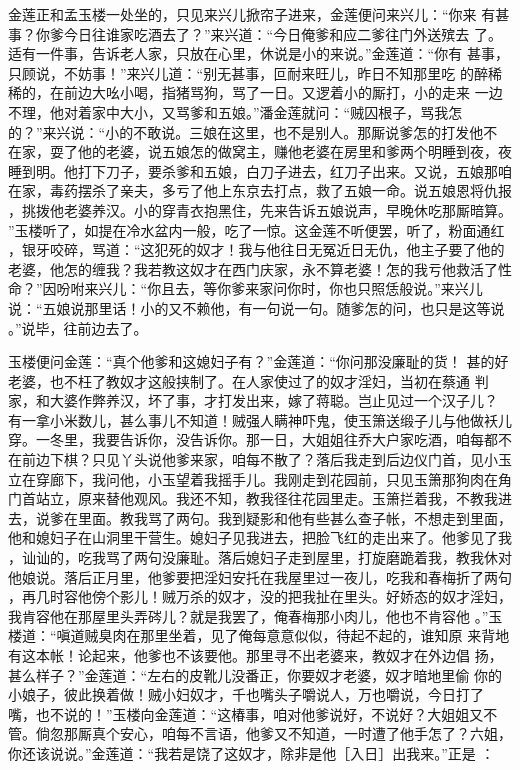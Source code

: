 金莲正和孟玉楼一处坐的，只见来兴儿掀帘子进来，金莲便问来兴儿：“你来
有甚事？你爹今日往谁家吃酒去了？”来兴道：“今日俺爹和应二爹往门外送殡去
了。适有一件事，告诉老人家，只放在心里，休说是小的来说。”金莲道：“你有
甚事，只顾说，不妨事！”来兴儿道：“别无甚事，叵耐来旺儿，昨日不知那里吃
的醉稀稀的，在前边大吆小喝，指猪骂狗，骂了一日。又逻着小的厮打，小的走来
一边不理，他对着家中大小，又骂爹和五娘。”潘金莲就问：“贼囚根子，骂我怎
的？”来兴说：“小的不敢说。三娘在这里，也不是别人。那厮说爹怎的打发他不
在家，耍了他的老婆，说五娘怎的做窝主，赚他老婆在房里和爹两个明睡到夜，夜
睡到明。他打下刀子，要杀爹和五娘，白刀子进去，红刀子出来。又说，五娘那咱
在家，毒药摆杀了亲夫，多亏了他上东京去打点，救了五娘一命。说五娘恩将仇报
，挑拨他老婆养汉。小的穿青衣抱黑住，先来告诉五娘说声，早晚休吃那厮暗算。
”玉楼听了，如提在冷水盆内一般，吃了一惊。这金莲不听便罢，听了，粉面通红
，银牙咬碎，骂道：“这犯死的奴才！我与他往日无冤近日无仇，他主子要了他的
老婆，他怎的缠我？我若教这奴才在西门庆家，永不算老婆！怎的我亏他救活了性
命？”因吩咐来兴儿：“你且去，等你爹来家问你时，你也只照恁般说。”来兴儿
说：“五娘说那里话！小的又不赖他，有一句说一句。随爹怎的问，也只是这等说
。”说毕，往前边去了。

玉楼便问金莲：“真个他爹和这媳妇子有？”金莲道：“你问那没廉耻的货！
甚的好老婆，也不枉了教奴才这般挟制了。在人家使过了的奴才淫妇，当初在蔡通
判家，和大婆作弊养汉，坏了事，才打发出来，嫁了蒋聪。岂止见过一个汉子儿？
有一拿小米数儿，甚么事儿不知道！贼强人瞒神吓鬼，使玉箫送缎子儿与他做袄儿
穿。一冬里，我要告诉你，没告诉你。那一日，大姐姐往乔大户家吃酒，咱每都不
在前边下棋？只见丫头说他爹来家，咱每不散了？落后我走到后边仪门首，见小玉
立在穿廊下，我问他，小玉望着我摇手儿。我刚走到花园前，只见玉箫那狗肉在角
门首站立，原来替他观风。我还不知，教我径往花园里走。玉箫拦着我，不教我进
去，说爹在里面。教我骂了两句。我到疑影和他有些甚么查子帐，不想走到里面，
他和媳妇子在山洞里干营生。媳妇子见我进去，把脸飞红的走出来了。他爹见了我
，讪讪的，吃我骂了两句没廉耻。落后媳妇子走到屋里，打旋磨跪着我，教我休对
他娘说。落后正月里，他爹要把淫妇安托在我屋里过一夜儿，吃我和春梅折了两句
，再几时容他傍个影儿！贼万杀的奴才，没的把我扯在里头。好娇态的奴才淫妇，
我肯容他在那屋里头弄硶儿？就是我罢了，俺春梅那小肉儿，他也不肯容他
。”玉楼道：“嗔道贼臭肉在那里坐着，见了俺每意意似似，待起不起的，谁知原
来背地有这本帐！论起来，他爹也不该要他。那里寻不出老婆来，教奴才在外边倡
扬，甚么样子？”金莲道：“左右的皮靴儿没番正，你要奴才老婆，奴才暗地里偷
你的小娘子，彼此换着做！贼小妇奴才，千也嘴头子嚼说人，万也嚼说，今日打了
嘴，也不说的！”玉楼向金莲道：“这椿事，咱对他爹说好，不说好？大姐姐又不
管。倘忽那厮真个安心，咱每不言语，他爹又不知道，一时遭了他手怎了？六姐，
你还该说说。”金莲道：“我若是饶了这奴才，除非是他［入日］出我来。”正是
：

